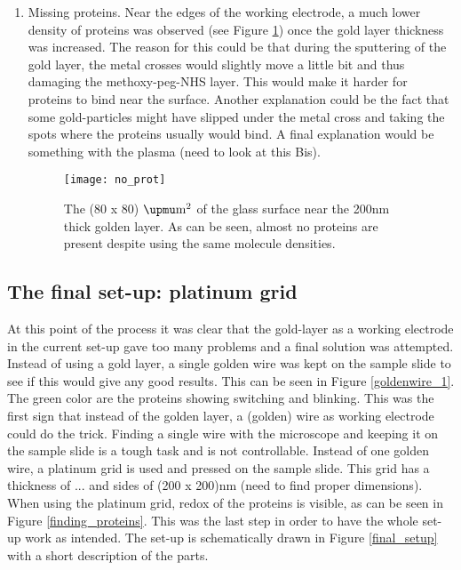 \documentclass[twoside,single]{lion-msc}
\begin{document}
\begin{enumerate}
\item Missing proteins.
Near the edges of the working electrode, a much lower density of proteins was observed (see Figure \ref{no_prot}) once the gold layer thickness was increased. The reason for this could be that during the sputtering of the gold layer, the metal crosses would slightly move a little bit and thus damaging the methoxy-peg-NHS layer. This would make it harder for proteins to bind near the surface. Another explanation could be the fact that some gold-particles might have slipped under the metal cross and taking the spots where the proteins usually would bind. A final explanation would be something with the plasma (need to look at this Bis).


\begin{figure}[ht!]
\centering
\texttt{[image: no\_prot]}
\caption{The (80 x 80) $\upmu \textup{m}^{2}$ of the glass surface near the 200nm thick golden layer. As can be seen, almost no proteins are present despite using the same molecule densities.}
\label{no_prot}
\end{figure}

\end{enumerate}

\subsection*{The final set-up: platinum grid} \label{grid_1}
At this point of the process it was clear that the gold-layer as a working electrode in the current set-up gave too many problems and a final solution was attempted. Instead of using a gold layer, a single golden wire was kept on the sample slide to see if this would give any good results. This can be seen in Figure \ref{goldenwire_1}. The green color are the proteins showing switching and blinking. This was the first sign that instead of the golden layer, a (golden) wire as working electrode could do the trick.  Finding a single wire with the microscope and keeping it on the sample slide is a tough task and is not controllable. Instead of one golden wire, a platinum grid is used and pressed on the sample slide. This grid has a thickness of ...  and sides of (200 x 200)nm (need to find proper dimensions). When using the platinum grid, redox of the proteins is visible, as can be seen in Figure \ref{finding_proteins}. This was the last step in order to have the whole set-up work as intended. The set-up is schematically drawn in Figure \ref{final_setup} with a short description of the parts.
\end{document}
